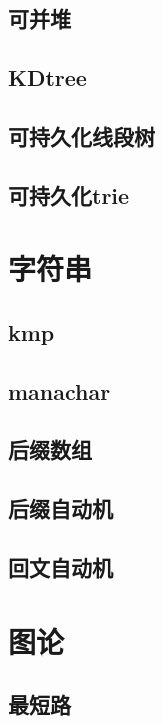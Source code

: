 \documentclass[UTF8,a4paper]{ctexart}
\begin{document}
\subsection{可并堆}

\subsection{KDtree}

\subsection{可持久化线段树}

\subsection{可持久化trie}

\section{字符串}

\subsection{kmp}

\subsection{manachar}

\subsection{后缀数组}

\subsection{后缀自动机}

\subsection{回文自动机}

\section{图论}

\subsection{最短路}
\end{document}

